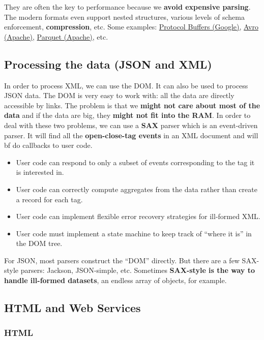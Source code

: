 They are often the key to performance because we {\bf avoid expensive parsing}. The modern formats even support nested structures, various levels of schema enforcement, {\bf compression}, etc. Some examples: \href{https://developers.google.com/protocol-buffers/docs/overview}{Protocol Buffers (Google)}, \href{https://avro.apache.org/docs/current/}{Avro (Apache)}, \href{https://parquet.apache.org/documentation/latest/}{Parquet (Apache)}, etc.

\subsection{Processing the data (JSON and XML)}

In order to process XML, we can use the DOM. It can also be used to process JSON data. The DOM is very easy to work with: all the data are directly accessible by links. The problem is that we {\bf might not care about most of the data} and if the data are big, they {\bf might not fit into the RAM}. In order to deal with these two problems, we can use a {\bf SAX} parser which is an event-driven parser. It will find all the {\bf open-close-tag events} in an XML document and will {bf do callbacks to user code}.

\begin{itemize}
\renewcommand{\labelitemi}{{\bf +}}
 \item User code can respond to only a subset of events corresponding to the tag it is interested in.
 \item User code can correctly compute aggregates from the data rather than create a record for each tag.
 \item User code can implement flexible error recovery strategies for ill-formed XML.
\renewcommand{\labelitemi}{{\bf --}}
 \item User code must implement a state machine to keep track of ``where it is'' in the DOM tree.
\end{itemize}

For JSON, most parsers construct the ``DOM'' directly. But there are a few SAX-style parsers: Jackson, JSON-simple, etc. Sometimes {\bf SAX-style is the way to handle ill-formed datasets}, an endless array of objects, for example.

\subsection{HTML and Web Services}

\subsubsection{HTML}

